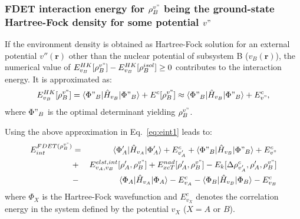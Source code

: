 \documentclass[amsmath,amssymb,preprint,aip,jcp]{revtex4-1}
\begin{document}
\subsubsection{FDET interaction energy for $\rho_B^{v"}$ being the ground-state Hartree-Fock density for some 
 potential $v"$} 
If the environment density is obtained as Hartree-Fock solution for an external potential $v''(\mathbf{r})$ other than the nuclear potential of subsystem B ($v_B(\mathbf{r})$), the numerical value of 
${E}^{HK}_{v_B}[\rho_B^{v"}]-{E}^{HK}_{v_B}[\rho_B^{isol}]\ge 0$ contributes to the interaction energy. 
It is approximated as:
\begin{eqnarray}
{E}^{HK}_{v_B}[\rho_B^{v"}]=\langle\Phi"_{B}\vert \hat{H}_{v_B}\vert \Phi"_{B}\rangle+E^{c}[\rho_B^{v"}] \approx \langle\Phi"_{B}\vert \hat{H}_{v_B}\vert \Phi"_{B}\rangle+E^{c}_{v"}, \label{eq:evb} 
\end{eqnarray}
where $\Phi"_{B}$ is the optimal determinant yielding $\rho_B^{v"}$.


Using the above approximation in Eq.~\ref{eq:eint1} leads to:
 \begin{eqnarray}
E_{int}^{FDET(\rho_B^{v"})} 
&=& \langle\Phi'_{A}\vert \hat{H}_{v_A}\vert \Phi'_{A}\rangle + E^{c}_{v'_A} + \langle\Phi"_{B}\vert \hat{H}_{v_B}\vert \Phi"_{B}\rangle + E^{c}_{v"} \label{eq:eint3}\\ \nonumber
&+& E^{elst,int}_{v_A,v_B}[\rho'_A,\rho_B^{v"}] + {E}_{xcT}^{nad}[\rho'_A,\rho_B^{v"}]- E_k[\Delta \rho^{c}_{v'_A}, \rho'_A, \rho_B^{v"}] \nonumber\\
&-& 
\langle\Phi_{A}\vert \hat{H}_{v_A}\vert \Phi_{A}\rangle - E^{c}_{v_A}
- \langle\Phi_{B}\vert \hat{H}_{v_B}\vert \Phi_{B}\rangle - E^{c}_{v_B}\nonumber
\end{eqnarray}
where $\Phi_{X}$ is the Hartree-Fock wavefunction and $E^{c}_{v_X}$ denotes the correlation energy in the system defined by the potential $v_X$ ($X=A$ or $B$).
\end{document}
